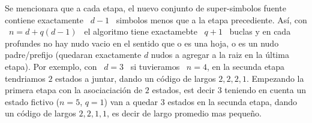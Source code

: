 %
Se  mencionara que  a cada  etapa, el  nuevo conjunto  de  super-simbolos fuente
contiene exactamente \ $d-1$ \ simbolos menos que a la etapa precediente. As\'i,
con \ $n = d  + q (d-1)$ \ el algoritmo tiene exactamebte \  $q+1$ \ buclas y en
cada profundes no hay  nudo vacio en el sentido que o es una  hoja, o es un nudo
padre/prefijo (quedaran exactamente $d$ nudos a agregar a la raiz en la \'ultima
etapa).  Por  exemplo, con \ $d =  3$ \ si tuvieramos  \ $n = 4$,  en la secunda
etapa tendriamos $2$ estados a juntar, dando un c\'odigo de largos $2, 2, 2, 1$.
Empezando la primera etapa con la  asociaciaci\'on de $2$ estados, est decir $3$
teniendo en cuenta un  estado fictivo ($n = 5$, $q = 1$)  van a quedar 3 estados
en la secunda etapa, dando un c\'odigo de largos $2, 2, 1, 1$, es decir de largo
promedio mas peque\~no.

